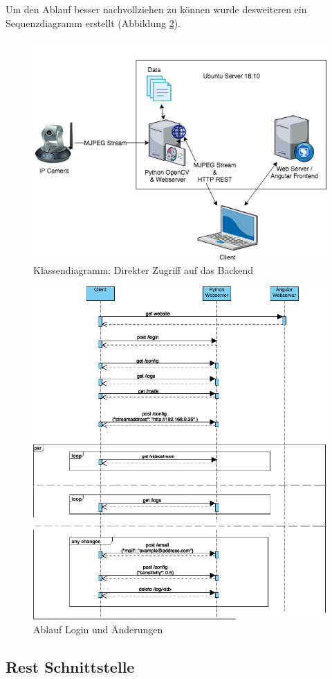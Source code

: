 Um den Ablauf besser nachvollziehen zu können wurde desweiteren ein Sequenzdiagramm erstellt (Abbildung \ref{img:sequencediagram}).

\begin{figure}[]
	\centering
	\includegraphics[width=\textwidth]{content/pictures/architecture-change.png}
	\caption{Klassendiagramm: Direkter Zugriff auf das Backend}
	\label{img:architecture-change}
\end{figure}

\begin{figure}[]
	\centering
	\includegraphics[width=\textwidth]{content/pictures/sequencediagram.png}
	\caption{Ablauf Login und Änderungen}
	\label{img:sequencediagram}
\end{figure}

\subsection{Rest Schnittstelle}